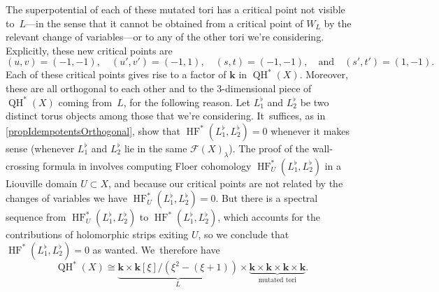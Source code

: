 \documentclass[JEP,XML,SOM,Unicode,NoEqCountersInSection,NoFloatCountersInSection,published]{cedram}
\theoremstyle{definition}
\newcommand{\LL}{L^\flat}
\newcommand{\Fuk}{\mathcal{F}}
\newcommand{\kk}{{\boldsymbol{k}}}
\newcommand{\HF}{\operatorname{HF}}
\newcommand{\QH}{\operatorname{QH}}
\begin{document}
The superpotential of each of these mutated tori has a critical point not visible to~$L$---in the sense that it cannot be obtained from a critical point of $W_L$ by the relevant change of variables---or to any of the other tori we're considering. Explicitly, these new critical points are
\[
(u, v) = (-1, -1), \quad (u', v') = (-1, 1), \quad (s, t) = (-1, -1), \quad \text{and} \quad (s', t') = (1, -1).
\]
Each of these critical points gives rise to a factor of $\kk$ in $\QH^*(X)$. Moreover, these are all orthogonal to each other and to the $3$-dimensional piece of $\QH^*(X)$ coming from~$L$, for the following reason. Let $\LL_1$ and $\LL_2$ be two distinct torus objects among those that we're considering. It~suffices, as in \cref{propIdempotentsOrthogonal}, show that $\HF^*(\LL_1, \LL_2) = 0$ whenever it makes sense (\ie whenever $\LL_1$ and $\LL_2$ lie in the same $\Fuk(X)_\lambda$). The proof of the wall-crossing formula in \cite{PascaleffTonkonog} involves computing Floer cohomology $\HF^*_U(\LL_1, \LL_2)$ in a Liouville domain $U \subset X$, and because our critical points are not related by the changes of variables we have $\HF_U^*(\LL_1, \LL_2) = 0$. But there is a spectral sequence from $\HF_U^*(\LL_1, \LL_2)$ to $\HF^*(\LL_1, \LL_2)$, which accounts for the contributions of holomorphic strips exiting $U$, so we conclude that $\HF^*(\LL_1, \LL_2) = 0$ as wanted. We~therefore have
\[
\QH^*(X) \cong \underbrace{\kk \times \kk[\xi]/(\xi^2-(\xi+1))}_L \times \underbrace{\kk \times \kk \times \kk \times \kk}_\text{mutated tori}.
\]

\backmatter


\end{document}
